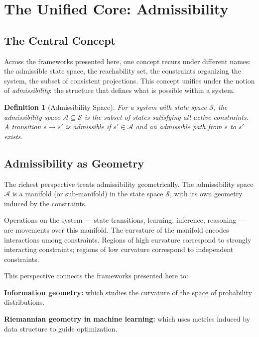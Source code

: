 \documentclass[11pt, a4paper]{article}
\theoremstyle{named}
\newtheorem{definition}{Definition}
\begin{document}
\section{The Unified Core: Admissibility}

\subsection{The Central Concept}

Across the frameworks presented here, one concept recurs under
different names: the admissible state space, the reachability set,
the constraints organizing the system, the subset of consistent
projections. This concept unifies under the notion of
\emph{admissibility}: the structure that defines what is possible
within a system.

\begin{definition}[Admissibility Space]
For a system with state space $\mathcal{S}$, the admissibility space
$\mathcal{A} \subseteq \mathcal{S}$ is the subset of states satisfying
all active constraints. A transition $s \to s'$ is admissible if
$s' \in \mathcal{A}$ and an admissible path from $s$ to $s'$ exists.
\end{definition}

\subsection{Admissibility as Geometry}

The richest perspective treats admissibility geometrically. The
admissibility space $\mathcal{A}$ is a manifold (or sub-manifold) in
the state space $\mathcal{S}$, with its own geometry induced by the
constraints.

Operations on the system --- state transitions, learning, inference,
reasoning --- are movements over this manifold. The curvature of the
manifold encodes interactions among constraints. Regions of high
curvature correspond to strongly interacting constraints; regions of
low curvature correspond to independent constraints.

This perspective connects the frameworks presented here to:

\textbf{Information geometry:} which studies the curvature of the
space of probability distributions.

\textbf{Riemannian geometry in machine learning:} which uses metrics
induced by data structure to guide optimization.
\end{document}

